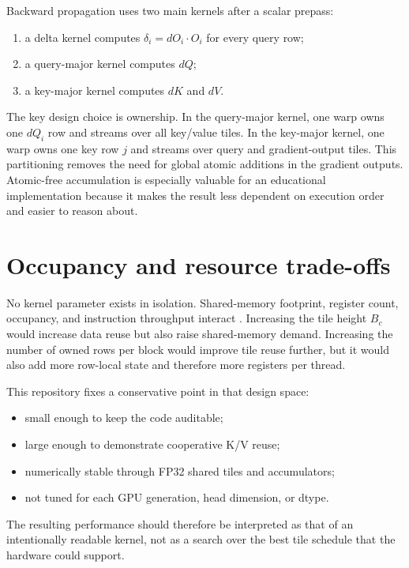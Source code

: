 Backward propagation uses two main kernels after a scalar prepass:
\begin{enumerate}
  \item a delta kernel computes $\delta_i = dO_i \cdot O_i$ for every query row;
  \item a query-major kernel computes $dQ$;
  \item a key-major kernel computes $dK$ and $dV$.
\end{enumerate}

The key design choice is ownership. In the query-major kernel, one warp owns one $dQ_i$ row and streams over all key/value tiles. In the key-major kernel, one warp owns one key row $j$ and streams over query and gradient-output tiles. This partitioning removes the need for global atomic additions in the gradient outputs. Atomic-free accumulation is especially valuable for an educational implementation because it makes the result less dependent on execution order and easier to reason about.

\section{Occupancy and resource trade-offs}

No kernel parameter exists in isolation. Shared-memory footprint, register count, occupancy, and instruction throughput interact \citep{volkov2010occupancy}. Increasing the tile height $B_c$ would increase data reuse but also raise shared-memory demand. Increasing the number of owned rows per block would improve tile reuse further, but it would also add more row-local state and therefore more registers per thread.

This repository fixes a conservative point in that design space:
\begin{itemize}
  \item small enough to keep the code auditable;
  \item large enough to demonstrate cooperative K/V reuse;
  \item numerically stable through FP32 shared tiles and accumulators;
  \item not tuned for each GPU generation, head dimension, or dtype.
\end{itemize}

The resulting performance should therefore be interpreted as that of an intentionally readable kernel, not as a search over the best tile schedule that the hardware could support.

